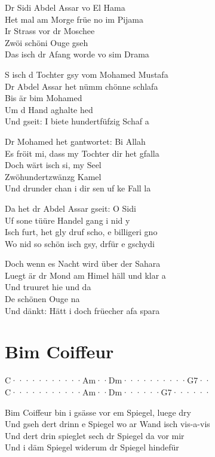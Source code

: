 \documentclass[
  letterpaper,
  a5paper]{memoir}
\begin{document}
Dr Sidi Abdel Assar vo El Hama\\
Het mal am Morge früe no im Pijama\\
Ir Strass vor dr Moschee\\
Zwöi schöni Ouge gseh\\
Das isch dr Afang worde vo sim Drama

S isch d Tochter gsy vom Mohamed Mustafa\\
Dr Abdel Assar het nümm chönne schlafa\\
Bis är bim Mohamed\\
Um d Hand aghalte hed\\
Und gseit: I biete hundertfüfzig Schaf a

Dr Mohamed het gantwortet: Bi Allah\\
Es fröit mi, dass my Tochter dir het gfalla\\
Doch wärt isch si, my Seel\\
Zwöhundertzwänzg Kamel\\
Und drunder chan i dir sen uf ke Fall la

Da het dr Abdel Assar gseit: O Sidi\\
Uf sone tüüre Handel gang i nid y\\
Isch furt, het gly druf scho, e billigeri gno\\
Wo nid so schön isch gsy, drfür e gschydi

Doch wenn es Nacht wird über der Sahara\\
Luegt är dr Mond am Himel häll und klar a\\
Und truuret hie und da\\
De schönen Ouge na\\
Und dänkt: Hätt i doch früecher afa spara

\hypertarget{bim-coiffeur}{%
\chapter{Bim Coiffeur}\label{bim-coiffeur}}

\textbar C·······\textbar····Am··\textbar Dm······\textbar····G7··\textbar{}\\
\textbar C·······\textbar····Am··\textbar Dm······\textbar G7······\textbar{}

Bim Coiffeur bin i gsässe vor em Spiegel, luege dry\\
Und gseh dert drinn e Spiegel wo ar Wand isch vis-a-vis\\
Und dert drin spieglet sech dr Spiegel da vor mir\\
Und i däm Spiegel widerum dr Spiegel hindefür
\end{document}
